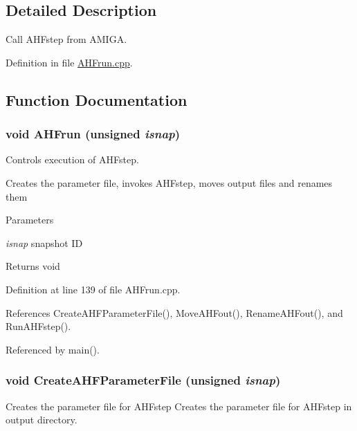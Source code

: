 \subsection{Detailed Description}
Call AHFstep from AMIGA. 

Definition in file \hyperlink{AHFrun_8cpp_source}{AHFrun.cpp}.



\subsection{Function Documentation}
\subsubsection[{AHFrun}]{\setlength{\rightskip}{0pt plus 5cm}void AHFrun (unsigned {\em isnap})}\label{AHFrun_8cpp_a4dfcaa53f6208d77814e562b7dab7d94}


Controls execution of AHFstep. 

Creates the parameter file, invokes AHFstep, moves output files and renames them 
\begin{DoxyParams}{Parameters}
\item[{\em isnap}]snapshot ID \end{DoxyParams}
\begin{DoxyReturn}{Returns}
void 
\end{DoxyReturn}


Definition at line 139 of file AHFrun.cpp.



References CreateAHFParameterFile(), MoveAHFout(), RenameAHFout(), and RunAHFstep().



Referenced by main().

\subsubsection[{CreateAHFParameterFile}]{\setlength{\rightskip}{0pt plus 5cm}void CreateAHFParameterFile (unsigned {\em isnap})}\label{AHFrun_8cpp_a498c71a5b2c0c5e91a49eefbec7bde28}


Creates the parameter file for AHFstep Creates the parameter file for AHFstep in output directory. 



